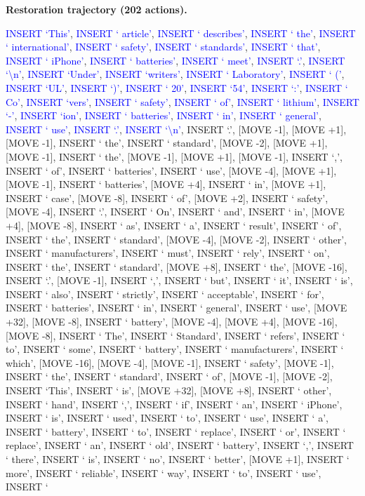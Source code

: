 \documentclass[11pt]{article}
\begin{document}
\vspace{0.4em}
\textbf{Restoration trajectory (202 actions).}\par
{
\ttfamily\scriptsize\raggedright\setlength{\parindent}{0pt}
\textcolor{blue}{INSERT `This'}, \textcolor{blue}{INSERT ` article'}, \textcolor{blue}{INSERT ` describes'}, \textcolor{blue}{INSERT ` the'}, \textcolor{blue}{INSERT ` international'}, \textcolor{blue}{INSERT ` safety'}, \textcolor{blue}{INSERT ` standards'}, \textcolor{blue}{INSERT ` that'}, \textcolor{blue}{INSERT ` iPhone'}, \textcolor{blue}{INSERT ` batteries'}, \textcolor{blue}{INSERT ` meet'}, \textcolor{blue}{INSERT `.'}, \textcolor{blue}{INSERT `\textbackslash{}n'}, \textcolor{blue}{INSERT `Under'}, \textcolor{blue}{INSERT `writers'}, \textcolor{blue}{INSERT ` Laboratory'}, \textcolor{blue}{INSERT ` ('}, \textcolor{blue}{INSERT `UL'}, \textcolor{blue}{INSERT `)'}, \textcolor{blue}{INSERT ` 20'}, \textcolor{blue}{INSERT `54'}, \textcolor{blue}{INSERT `:'}, \textcolor{blue}{INSERT ` Co'}, \textcolor{blue}{INSERT `vers'}, \textcolor{blue}{INSERT ` safety'}, \textcolor{blue}{INSERT ` of'}, \textcolor{blue}{INSERT ` lithium'}, \textcolor{blue}{INSERT `-'}, \textcolor{blue}{INSERT `ion'}, \textcolor{blue}{INSERT ` batteries'}, \textcolor{blue}{INSERT ` in'}, \textcolor{blue}{INSERT ` general'}, \textcolor{blue}{INSERT ` use'}, \textcolor{blue}{INSERT `.'}, \textcolor{blue}{INSERT `\textbackslash{}n'}, INSERT `.', [MOVE -1], [MOVE +1], [MOVE -1], INSERT ` the', INSERT ` standard', [MOVE -2], [MOVE +1], [MOVE -1], INSERT ` the', [MOVE -1], [MOVE +1], [MOVE -1], INSERT `,', INSERT ` of', INSERT ` batteries', INSERT ` use', [MOVE -4], [MOVE +1], [MOVE -1], INSERT ` batteries', [MOVE +4], INSERT ` in', [MOVE +1], INSERT ` case', [MOVE -8], INSERT ` of', [MOVE +2], INSERT ` safety', [MOVE -4], INSERT `.', INSERT ` On', INSERT ` and', INSERT ` in', [MOVE +4], [MOVE -8], INSERT ` as', INSERT ` a', INSERT ` result', INSERT ` of', INSERT ` the', INSERT ` standard', [MOVE -4], [MOVE -2], INSERT ` other', INSERT ` manufacturers', INSERT ` must', INSERT ` rely', INSERT ` on', INSERT ` the', INSERT ` standard', [MOVE +8], INSERT ` the', [MOVE -16], INSERT `.', [MOVE -1], INSERT `,', INSERT ` but', INSERT ` it', INSERT ` is', INSERT ` also', INSERT ` strictly', INSERT ` acceptable', INSERT ` for', INSERT ` batteries', INSERT ` in', INSERT ` general', INSERT ` use', [MOVE +32], [MOVE -8], INSERT ` battery', [MOVE -4], [MOVE +4], [MOVE -16], [MOVE -8], INSERT ` The', INSERT ` Standard', INSERT ` refers', INSERT ` to', INSERT ` some', INSERT ` battery', INSERT ` manufacturers', INSERT ` which', [MOVE -16], [MOVE -4], [MOVE -1], INSERT ` safety', [MOVE -1], INSERT ` the', INSERT ` standard', INSERT ` of', [MOVE -1], [MOVE -2], INSERT `This', INSERT ` is', [MOVE +32], [MOVE +8], INSERT ` other', INSERT ` hand', INSERT `,', INSERT ` if', INSERT ` an', INSERT ` iPhone', INSERT ` is', INSERT ` used', INSERT ` to', INSERT ` use', INSERT ` a', INSERT ` battery', INSERT ` to', INSERT ` replace', INSERT ` or', INSERT ` replace', INSERT ` an', INSERT ` old', INSERT ` battery', INSERT `,', INSERT ` there', INSERT ` is', INSERT ` no', INSERT ` better', [MOVE +1], INSERT ` more', INSERT ` reliable', INSERT ` way', INSERT ` to', INSERT ` use', INSERT ` }
\end{document}
